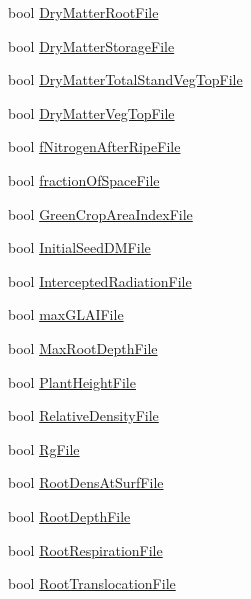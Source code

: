 \begin{DoxyCompactItemize}
\item 
bool \hyperlink{classcrop_parameters_crop_a35b09e89e45d0141635157fdedda5c61}{DryMatterRootFile}
\item 
bool \hyperlink{classcrop_parameters_crop_a5e29396febd09908d9ca07d2ab5103ec}{DryMatterStorageFile}
\item 
bool \hyperlink{classcrop_parameters_crop_a79ada835cc803045ced706f18c12993e}{DryMatterTotalStandVegTopFile}
\item 
bool \hyperlink{classcrop_parameters_crop_a8fd3ba9e6058886ae5084700070a9abd}{DryMatterVegTopFile}
\item 
bool \hyperlink{classcrop_parameters_crop_aa144697ce6a7729dae519c48a8669c0f}{fNitrogenAfterRipeFile}
\item 
bool \hyperlink{classcrop_parameters_crop_a5ab7a13e0432be140004f2b02dfc9a93}{fractionOfSpaceFile}
\item 
bool \hyperlink{classcrop_parameters_crop_a3032791c76913325f4ddb2a0b14cf208}{GreenCropAreaIndexFile}
\item 
bool \hyperlink{classcrop_parameters_crop_aaa366d71c050f3a1da7ea82537aa0e25}{InitialSeedDMFile}
\item 
bool \hyperlink{classcrop_parameters_crop_a39bea7262ce5866d4aa050add51ebb83}{InterceptedRadiationFile}
\item 
bool \hyperlink{classcrop_parameters_crop_a264ca877ed32701c02dc206ca5b0c9a5}{maxGLAIFile}
\item 
bool \hyperlink{classcrop_parameters_crop_a4a67f15cbf26322f21d1a29efe42f431}{MaxRootDepthFile}
\item 
bool \hyperlink{classcrop_parameters_crop_ab9d5b63cf6c5e8c2121b2c2068eb6b65}{PlantHeightFile}
\item 
bool \hyperlink{classcrop_parameters_crop_a643fad637c770e0ab776c0eed311a5d3}{RelativeDensityFile}
\item 
bool \hyperlink{classcrop_parameters_crop_a7b3907a9cfdf349ce5ba692aff92afe4}{RgFile}
\item 
bool \hyperlink{classcrop_parameters_crop_a249f2e84c322e366ae3ad47bc4e3a6d8}{RootDensAtSurfFile}
\item 
bool \hyperlink{classcrop_parameters_crop_a057a401f9e7648be1f9603bef70f0f0e}{RootDepthFile}
\item 
bool \hyperlink{classcrop_parameters_crop_afd9cb029797b6546aa960478d8d6c93a}{RootRespirationFile}
\item 
bool \hyperlink{classcrop_parameters_crop_ad73a5d98921c9d95922d503969d3a23d}{RootTranslocationFile}
\item 

\end{DoxyCompactItemize}
